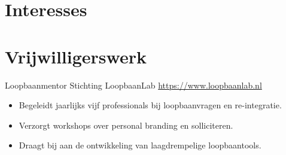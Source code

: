 \documentclass[a4paper, serif, 10pt]{moderncv}
\begin{document}
\section{Interesses}

\section{Vrijwilligerswerk}

        {Loopbaanmentor}
        {Stichting LoopbaanLab}
        {\url{https://www.loopbaanlab.nl}}
        {}
        {\begin{itemize}
\item Begeleidt jaarlijks vijf professionals bij loopbaanvragen en re-integratie.
\item Verzorgt workshops over personal branding en solliciteren.
\item Draagt bij aan de ontwikkeling van laagdrempelige loopbaantools.
\end{itemize}}
    
\end{document}
